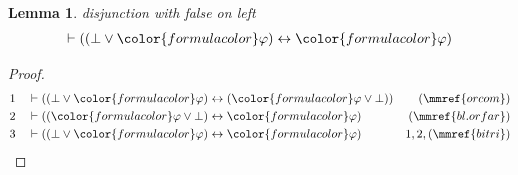 \documentclass{article}
\theoremstyle{plain}
\newtheorem{lemma}{Theorem}[section]
\newtheorem{lemma}[theorem]{Lemma}
\begin{document}
\begin{lemma} disjunction with false  on left
\begin{align}
\vdash ( ( \bot \vee {\color{formulacolor}\varphi} ) \leftrightarrow
    {\color{formulacolor}\varphi} )\label{bl.orfal}
\end{align}
\end{lemma}

\begin{proof}
\begin{align}
  1 && & \vdash ( ( \bot \vee {\color{formulacolor}\varphi} ) \leftrightarrow (
      {\color{formulacolor}\varphi} \vee \bot )
      )&(\mmref{orcom})\notag
  \\ 2 && & \vdash ( ( {\color{formulacolor}\varphi} \vee \bot )
      \leftrightarrow {\color{formulacolor}\varphi}
      )&(\mmref{bl.orfar})\notag
  \\ 3 && & \vdash ( ( \bot \vee {\color{formulacolor}\varphi} )
      \leftrightarrow {\color{formulacolor}\varphi}
      )&1,2,(\mmref{bitri})\notag
\end{align}
\end{proof}
\end{document}
